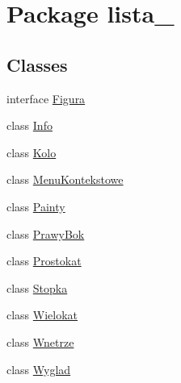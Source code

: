 \hypertarget{namespacelista__5}{}\section{Package lista\+\_}
\label{namespacelista__5}
\subsection*{Classes}
\begin{DoxyCompactItemize}
\item 
interface \mbox{\hyperlink{interfacelista__5_1_1_figura}{Figura}}
\item 
class \mbox{\hyperlink{classlista__5_1_1_info}{Info}}
\item 
class \mbox{\hyperlink{classlista__5_1_1_kolo}{Kolo}}
\item 
class \mbox{\hyperlink{classlista__5_1_1_menu_kontekstowe}{Menu\+Kontekstowe}}
\item 
class \mbox{\hyperlink{classlista__5_1_1_painty}{Painty}}
\item 
class \mbox{\hyperlink{classlista__5_1_1_prawy_bok}{Prawy\+Bok}}
\item 
class \mbox{\hyperlink{classlista__5_1_1_prostokat}{Prostokat}}
\item 
class \mbox{\hyperlink{classlista__5_1_1_stopka}{Stopka}}
\item 
class \mbox{\hyperlink{classlista__5_1_1_wielokat}{Wielokat}}
\item 
class \mbox{\hyperlink{classlista__5_1_1_wnetrze}{Wnetrze}}
\item 
class \mbox{\hyperlink{classlista__5_1_1_wyglad}{Wyglad}}
\end{DoxyCompactItemize}

